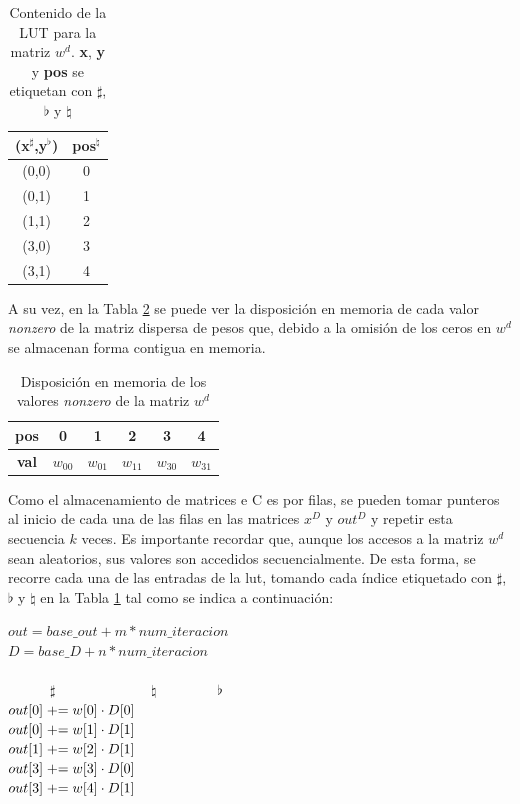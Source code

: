 \begin{table}[h!]
    \centering
    \begin{tabular}{|c|c|}
    \hline
    \textbf{(x$^{\sharp}$,y$^{\flat}$)} & \textbf{pos$^{\natural}$} \\\hline
    (0,0) & 0 \\\hline
    (0,1) & 1 \\\hline
    (1,1) & 2 \\\hline
    (3,0) & 3 \\\hline
    (3,1) & 4 \\\hline
    \end{tabular}
    \caption{Contenido de la LUT para la matriz $w^{d}$. \textbf{x}, \textbf{y} y \textbf{pos} se etiquetan con $\sharp$, {\large$\flat$} y $\natural$}
    \label{tab:lut_example}
\end{table}

A su vez, en la Tabla \ref{tab:w_matrix_memory_layout} se puede ver la disposición en memoria de cada valor \textit{nonzero} de la matriz dispersa de pesos que, debido a la omisión de los ceros en $w^{d}$ se almacenan forma contigua en memoria.

\begin{table}[h!]
    \centering
    \begin{tabular}{|c|c|c|c|c|c|}
        \hline
        \textbf{pos} & 0 & 1 & 2 & 3 & 4 \\\hline
        \textbf{val} & $w_{00}$ & $w_{01}$ & $w_{11}$ & $w_{30}$ & $w_{31}$ \\\hline
    \end{tabular}
    \caption{Disposición en memoria de los valores \textit{nonzero} de la matriz $w^{d}$}
    \label{tab:w_matrix_memory_layout}
\end{table}

Como el almacenamiento de matrices e C es por filas, se pueden tomar punteros al inicio de cada una de las filas en las matrices $x^{D}$ y $out^{D}$ y repetir esta secuencia $k$ veces. Es importante recordar que, aunque los accesos a la matriz $w^{d}$ sean aleatorios, sus valores son accedidos secuencialmente. De esta forma, se recorre cada una de las entradas de la \acrshort{lut}, tomando cada índice etiquetado con $\sharp$, $\flat$ y $\natural$ en la Tabla \ref{tab:lut_example} tal como se indica a continuación:

\begin{center}
    $out = base\_out + m*num\_iteracion$\\
    $D = base\_D + n*num\_iteracion$\\
    \ \\
    \ \ \ \ \ \  $\sharp$ \ \ \ \ \ \ \ \ \ \ \ \ \  $\natural$ \ \ \ \ \ \ \ \  {\large$\flat$} \ \\
    $out[0] \mathrel{+}= w[0] \cdot D[0]$\\
    $out[0] \mathrel{+}= w[1] \cdot D[1]$\\
    $out[1] \mathrel{+}= w[2] \cdot D[1]$\\
    $out[3] \mathrel{+}= w[3] \cdot D[0]$\\
    $out[3] \mathrel{+}= w[4] \cdot D[1]$\\
\end{center}

